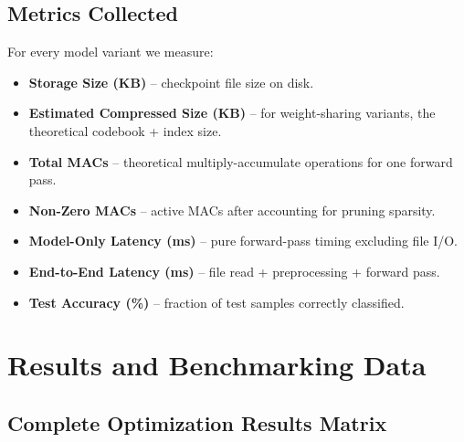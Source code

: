 \documentclass[12pt,a4paper]{article}
\begin{document}
\subsection{Metrics Collected}

For every model variant we measure:
\begin{itemize}
  \item \textbf{Storage Size (KB)} -- checkpoint file size on disk.
  \item \textbf{Estimated Compressed Size (KB)} -- for weight-sharing variants,
        the theoretical codebook + index size.
  \item \textbf{Total MACs} -- theoretical multiply-accumulate operations for
        one forward pass.
  \item \textbf{Non-Zero MACs} -- active MACs after accounting for pruning
        sparsity.
  \item \textbf{Model-Only Latency (ms)} -- pure forward-pass timing excluding
        file I/O.
  \item \textbf{End-to-End Latency (ms)} -- file read + preprocessing +
        forward pass.
  \item \textbf{Test Accuracy (\%)} -- fraction of test samples correctly
        classified.
\end{itemize}

\section{Results and Benchmarking Data}

\subsection{Complete Optimization Results Matrix}
\end{document}
